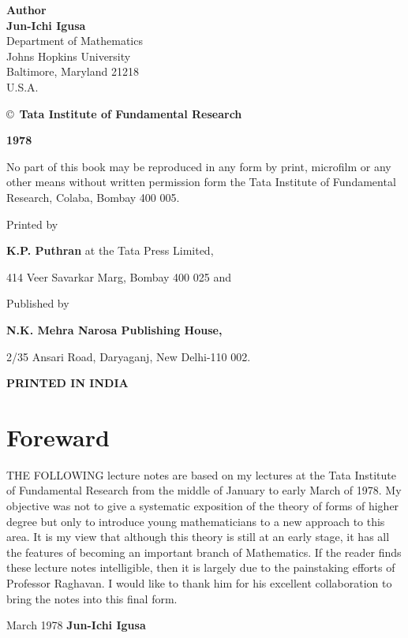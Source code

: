 \thispagestyle{empty}
\begin{center}
  \textbf{Author}\\[5pt]
  {\large\bf Jun-Ichi Igusa}\\
  Department of Mathematics\\
  Johns Hopkins University\\
  Baltimore, Maryland 21218\\
  U.S.A.\\
  \vfill

  \copyright\, {\bf Tata Institute of Fundamental Research}

  {\bf 1978}
  \vfill


\parbox{0.7\textwidth}{No part of this book may be reproduced in 
any form by print, microfilm or any other means without written 
permission form the Tata Institute of Fundamental Research, 
Colaba, Bombay 400 005.}
\vfill

  Printed by
 
  {\bf K.P. Puthran} at the Tata Press Limited,

  414 Veer Savarkar Marg, Bombay 400 025 and 
\medskip

  Published by
 
 {\bf  N.K. Mehra Narosa Publishing House,}
 
  2/35 Ansari Road, Daryaganj, New Delhi-110 002.

  \textbf{PRINTED IN INDIA}
\end{center}

\eject


\thispagestyle{empty}

\chapter{Foreward}


THE FOLLOWING lecture notes are based on my lectures at the Tata
Institute of Fundamental Research from the middle of January to early
March of 1978. My objective was not to give a systematic exposition of
the theory of forms of higher degree but only to introduce young
mathematicians to a new approach to this area. It is my view that
although this theory is still at an early stage, it has all the
features of becoming an important branch of Mathematics. If the reader
finds these lecture notes intelligible, then it is largely due to the
painstaking efforts of Professor Raghavan. I would like to thank him
for his excellent collaboration to bring the notes into this final
form.
\vskip 2cm

 March 1978 \hfill {\large\bf Jun-Ichi Igusa}
